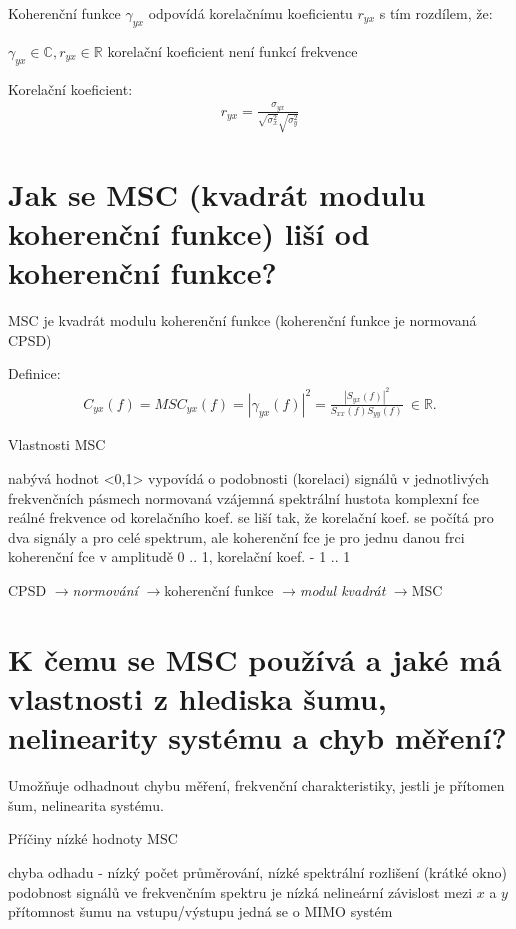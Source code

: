 \documentclass[a4paper,12pt]{article}   %
\newcommand{\rrarr}{$\rightarrow$}
\newcommand{\mt}[1]{$#1$}
\newcommand{\yx}{_{yx}}
\newcommand{\xx}{_{xx}}
\newcommand{\yy}{_{yy}}
\begin{document}
Koherenční funkce \mt{\gamma_{yx}} odpovídá korelačnímu koeficientu \mt{r_{yx}} s tím rozdílem, že:
\begin{outline}
        \1 \mt{\gamma_{yx} \in \mathbb{C}, r_{yx} \in \mathbb{R}}
        \1 korelační koeficient není funkcí frekvence
\end{outline}

Korelační koeficient:
\begin{align*}
        r_{yx} = \frac{\sigma_{yx}}{\sqrt{\sigma_x^2}\sqrt{\sigma_y^2}}
\end{align*}


\section{Jak se MSC (kvadrát modulu koherenční funkce) liší od koherenční funkce?}

MSC je  kvadrát modulu koherenční funkce (koherenční funkce je normovaná CPSD)

Definice:
\begin{align*}
        C_{yx}(f) = MSC_{yx}(f) = |\gamma_{yx}(f)|^2 = \frac{|S\yx (f)|^2 }{S\xx (f)S\yy (f)} ~\in \mathbb{R}.
\end{align*}

Vlastnosti MSC
\begin{outline}
        \1 nabývá hodnot <0,1>
        \1 vypovídá o podobnosti (korelaci) signálů v jednotlivých frekvenčních pásmech
        \1 normovaná vzájemná spektrální hustota
        \1 komplexní fce reálné frekvence
        \1 od korelačního koef. se liší tak, že korelační koef. se počítá pro dva signály a pro celé spektrum, ale koherenční fce je pro jednu danou frci
        \1 koherenční fce v amplitudě 0 .. 1, korelační koef. - 1 .. 1
\end{outline}


CPSD \rrarr \textit{normování} \rrarr koherenční funkce \rrarr \textit{modul kvadrát} \rrarr MSC


\section{K čemu se MSC používá a jaké má vlastnosti z hlediska šumu, nelinearity systému a chyb měření?}

Umožňuje odhadnout chybu měření, frekvenční charakteristiky, jestli je přítomen šum, nelinearita systému.

Příčiny nízké hodnoty MSC
\begin{outline}
        \1 chyba odhadu - nízký počet průměrování, nízké spektrální rozlišení (krátké okno)
        \1 podobnost signálů ve frekvenčním spektru je nízká
        \1 nelineární závislost mezi \mt{x} a \mt{y}
        \1 přítomnost šumu na vstupu/výstupu
        \1 jedná se o MIMO systém
\end{outline}
\end{document}
